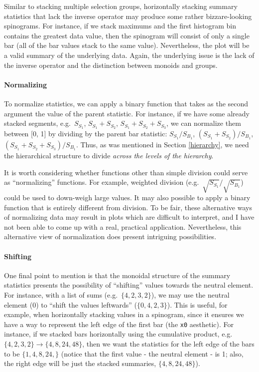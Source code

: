 \documentclass[
]{book}
\theoremstyle{definition}
\theoremstyle{definition}
\theoremstyle{definition}
\theoremstyle{definition}
\theoremstyle{remark}
\begin{document}
Similar to stacking multiple selection groups, horizontally stacking summary statistics that lack the inverse operator may produce some rather bizzare-looking spinograms. For instance, if we stack maximums and the first histogram bin contains the greatest data value, then the spinogram will consist of only a single bar (all of the bar values stack to the same value). Nevertheless, the plot will be a valid summary of the underlying data. Again, the underlying issue is the lack of the inverse operator and the distinction between monoids and groups.

\paragraph{Normalizing}\label{normalizing}

To normalize statistics, we can apply a binary function that takes as the second argument the value of the parent statistic. For instance, if we have some already stacked segments, e.g.~\(S_{S_1}\), \(S_{S_1} + S_{S_2}\), \(S_{S_1} + S_{S_2} + S_{S_3}\), we can normalize them between {[}0, 1{]} by dividing by the parent bar statistic: \(S_{S_1} / S_{B_1}\), \((S_{S_1} + S_{S_2}) / S_{B_1}\), \((S_{S_1} + S_{S_2} + S_{S_3}) / S_{B_1}\). Thus, as was mentioned in Section \ref{hierarchy}, we need the hierarchical structure to divide \emph{across the levels of the hierarchy}.

It is worth considering whether functions other than simple division could serve as ``normalizing'' functions. For example, weighted division (e.g.~\(\sqrt{S_{S_1}} / \sqrt{S_{B_1}}\)) could be used to down-weigh large values. It may also possible to apply a binary function that is entirely different from division. To be fair, these alternative ways of normalizing data may result in plots which are difficult to interpret, and I have not been able to come up with a real, practical application. Nevertheless, this alternative view of normalization does present intriguing possibilities.

\paragraph{Shifting}\label{shifting}

One final point to mention is that the monoidal structure of the summary statistics presents the possibility of ``shifting'' values towards the neutral element. For instance, with a list of sums (e.g.~\(\{ 4, 2, 3, 2 \}\)), we may use the neutral element (0) to ``shift the values leftwards'' (\(\{ 0, 4, 2, 3 \}\)). This is useful, for example, when horizontally stacking values in a spinogram, since it ensures we have a way to represent the left edge of the first bar (the \texttt{x0} aesthetic). For instance, if we stacked bars horizontally using the cumulative product, e.g.~\(\{ 4, 2, 3, 2 \} \to \{ 4, 8, 24, 48 \}\), then we want the statistics for the left edge of the bars to be \(\{ 1, 4, 8, 24, \}\) (notice that the first value - the neutral element - is 1; also, the right edge will be just the stacked summaries, \(\{ 4, 8, 24, 48 \}\)).
\end{document}
